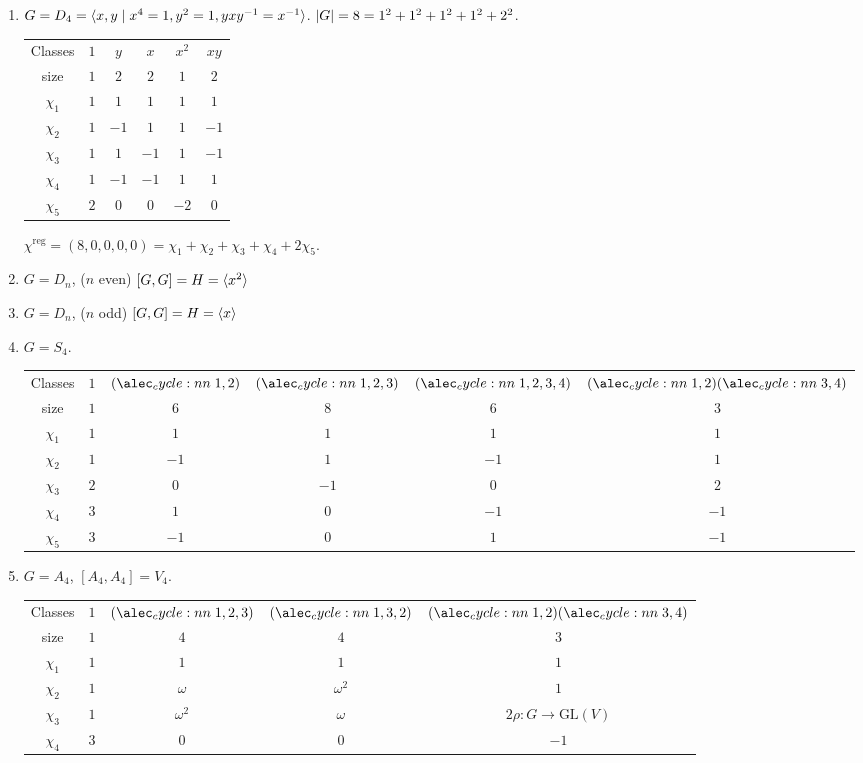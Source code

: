 \begin{enumerate}
  \item $G = D_4 = \langle x, y \mid x^4=1, y^2=1, yxy^{-1} = x^{-1}\rangle$.
    $\lvert G\rvert = 8 = 1^2 + 1^2 + 1^2 + 1^2 + 2^2$.
    \begin{center}
      \begin{tabular}{cccccc}
        Classes & $1$ & $y$ & $x$ & $x^2$ & $xy$ \\
        size & $1$ & $2$ & $2$ & $1$ & $2$ \\
        \hline
        $\chi_1$ & $1$ & $1$ & $1$ & $1$ & $1$ \\
        $\chi_2$ & $1$ & $-1$ & $1$ & $1$ & $-1$ \\
        $\chi_3$ & $1$ & $1$ & $-1$ & $1$ & $-1$ \\
        $\chi_4$ & $1$ & $-1$ & $-1$ & $1$ & $1$ \\
        $\chi_5$ & $2$ & $0$ & $0$ & $-2$ & $0$
      \end{tabular}
    \end{center}
    $\chi^\text{reg} = (8, 0, 0, 0, 0) = \chi_1 + \chi_2 + \chi_3 + \chi_4
    + 2\chi_5$.
  \item $G = D_n$, ($n$ even)
    $[G, G] = H = \langle x^2\rangle$
  \item $G = D_n$, ($n$ odd)
    $[G, G] = H = \langle x\rangle$
  \item $G = S_4$.
    \begin{center}
      \begin{tabular}{cccccc}
        Classes & $1$ & $\cycle{1,2}$ & $\cycle{1,2,3}$ & $\cycle{1,2,3,4}$
                & $\cycle{1,2}\cycle{3,4}$ \\
        size & $1$ & $6$ & $8$ & $6$ & $3$ \\
        \hline
        $\chi_1$ & $1$ & $1$ & $1$ & $1$ & $1$ \\
        $\chi_2$ & $1$ & $-1$ & $1$ & $-1$ & $1$ \\
        $\chi_3$ & $2$ & $0$ & $-1$ & $0$ & $2$ \\
        $\chi_4$ & $3$ & $1$ & $0$ & $-1$ & $-1$ \\
        $\chi_5$ & $3$ & $-1$ & $0$ & $1$ & $-1$
      \end{tabular}
    \end{center}
  \item $G = A_4$, $[A_4, A_4] = V_4$.
    \begin{center}
      \begin{tabular}{ccccc}
        Classes & $1$ & $\cycle{1,2,3}$ & $\cycle{1,3,2}$
                & $\cycle{1,2}\cycle{3,4}$ \\
        size & $1$ & $4$ & $4$ & $3$ \\
        \hline
        $\chi_1$ & $1$ & $1$ & $1$ & $1$ \\
        $\chi_2$ & $1$ & $\omega$ & $\omega^2$ & $1$ \\
        $\chi_3$ & $1$ & $\omega^2$ & $\omega$ & $2\rho: G\to \text{GL}(V)$ \\
        $\chi_4$ & $3$ & $0$ & $0$ & $-1$
      \end{tabular}
    \end{center}
\end{enumerate}


